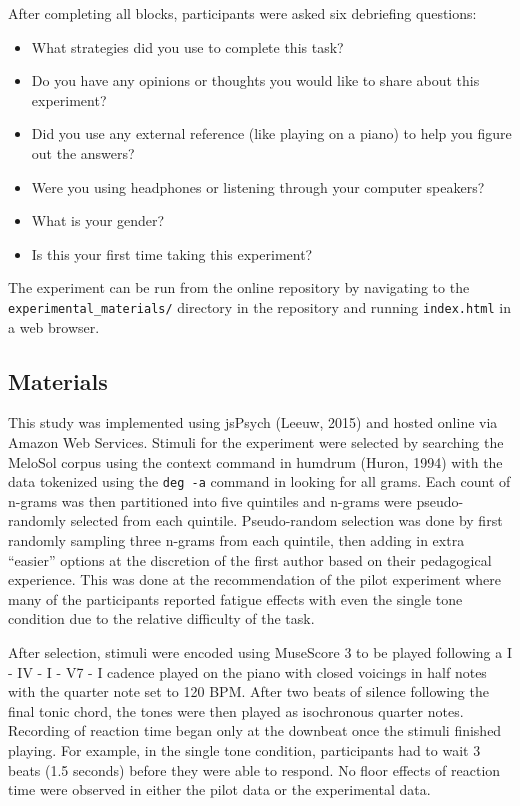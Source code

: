 \documentclass[english,man]{apa6}
\providecommand{\tightlist}{%
  \setlength{\itemsep}{0pt}\setlength{\parskip}{0pt}}
\begin{document}
After completing all blocks, participants were asked six debriefing questions:

\begin{itemize}
\tightlist
\item
  What strategies did you use to complete this task?
\item
  Do you have any opinions or thoughts you would like to share about this experiment?
\item
  Did you use any external reference (like playing on a piano) to help you figure out the answers?
\item
  Were you using headphones or listening through your computer speakers?
\item
  What is your gender?
\item
  Is this your first time taking this experiment?
\end{itemize}

The experiment can be run from the online repository by navigating to the \texttt{experimental\_materials/} directory in the repository and running \texttt{index.html} in a web browser.

\hypertarget{materials}{%
\subsection{Materials}\label{materials}}

This study was implemented using jsPsych (Leeuw, 2015) and hosted online via Amazon Web Services.
Stimuli for the experiment were selected by searching the MeloSol corpus using the context command in humdrum (Huron, 1994) with the data tokenized using the \texttt{deg\ -a} command in looking for all grams.
Each count of n-grams was then partitioned into five quintiles and n-grams were pseudo-randomly selected from each quintile.
Pseudo-random selection was done by first randomly sampling three n-grams from each quintile, then adding in extra \enquote{easier} options at the discretion of the first author based on their pedagogical experience.
This was done at the recommendation of the pilot experiment where many of the participants reported fatigue effects with even the single tone condition due to the relative difficulty of the task.

After selection, stimuli were encoded using MuseScore 3 to be played following a I - IV - I - V7 - I cadence played on the piano with closed voicings in half notes with the quarter note set to 120 BPM. After two beats of silence following the final tonic chord, the tones were then played as isochronous quarter notes.
Recording of reaction time began only at the downbeat once the stimuli finished playing.
For example, in the single tone condition, participants had to wait 3 beats (1.5 seconds) before they were able to respond.
No floor effects of reaction time were observed in either the pilot data or the experimental data.
\end{document}
